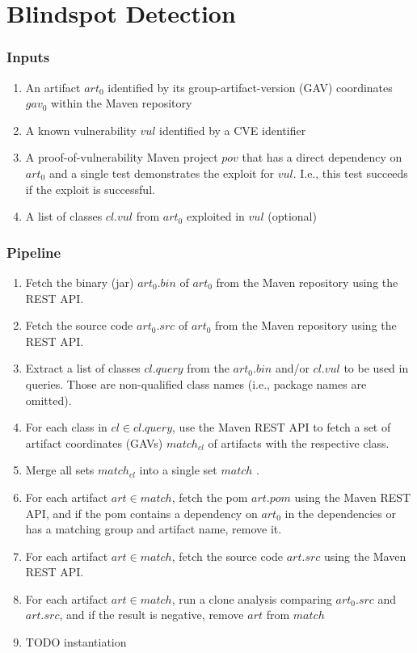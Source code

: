 \section{Blindspot Detection}
\label{sec:detection}

\subsubsection{Inputs}

\begin{enumerate}
	\item An artifact $art_0$ identified by its group-artifact-version (GAV) coordinates $gav_0$ within the Maven repository
	\item A known vulnerability $vul$ identified by a CVE identifier 
	\item A proof-of-vulnerability Maven project $pov$ that has a direct dependency on $art_0$ and a single test demonstrates the exploit for $vul$. I.e., this test succeeds if the exploit is successful.
	\item A list of classes $cl.vul$ from $art_0$ exploited in $vul$  (optional)
\end{enumerate}


\subsubsection{Pipeline}


\begin{enumerate}
	\item Fetch the binary (jar) $art_0.bin$  of $art_0$ from the Maven repository using the REST API.
	\item \label{pipeline:fetchsources} Fetch the source code  $art_0.src$  of $art_0$ from the Maven repository using the REST API.
	\item \label{pipeline:extractclasses} Extract a list of classes $cl.query$  from the  $art_0.bin$ and/or $cl.vul$ to be used in queries. Those are non-qualified class names (i.e., package names are omitted). 
	\item For each class in $cl \in cl.query$, use the Maven REST API to fetch a set of artifact coordinates (GAVs) $match_{cl}$  of artifacts with the respective class. 
	\item \label{pipeline:classconsolidation} Merge all sets $match_{cl}$ into a single set $match$ .
	\item  \label{pipeline:query}  For each artifact $art  \in match$, fetch the pom $art.pom$ using the Maven REST API, and if the pom contains a dependency on $art_0$ in the dependencies or has a matching group and artifact name, remove it. 
	\item For each artifact $art  \in match$, fetch the source code $art.src$ using the Maven REST API. 
	\item For each artifact $art  \in match$, run a clone analysis comparing $art_0.src$ and $art.src$, and if the result is negative, remove $art$ from $match$
	\item TODO instantiation
	
\end{enumerate}



